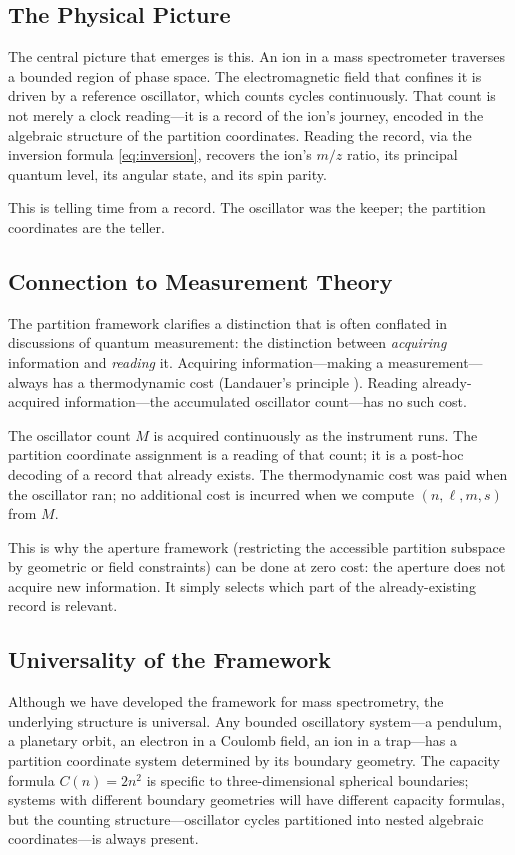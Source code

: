 \documentclass[twocolumn,10pt]{article}
\begin{document}
\subsection{The Physical Picture}

The central picture that emerges is this. An ion in a mass spectrometer traverses a bounded region of phase space. The electromagnetic field that confines it is driven by a reference oscillator, which counts cycles continuously. That count is not merely a clock reading---it is a record of the ion's journey, encoded in the algebraic structure of the partition coordinates. Reading the record, via the inversion formula \eqref{eq:inversion}, recovers the ion's $m/z$ ratio, its principal quantum level, its angular state, and its spin parity.

This is telling time from a record. The oscillator was the keeper; the partition coordinates are the teller.

\subsection{Connection to Measurement Theory}

The partition framework clarifies a distinction that is often conflated in discussions of quantum measurement: the distinction between \emph{acquiring} information and \emph{reading} it. Acquiring information---making a measurement---always has a thermodynamic cost (Landauer's principle \citep{landauer1961}). Reading already-acquired information---the accumulated oscillator count---has no such cost.

The oscillator count $M$ is acquired continuously as the instrument runs. The partition coordinate assignment is a reading of that count; it is a post-hoc decoding of a record that already exists. The thermodynamic cost was paid when the oscillator ran; no additional cost is incurred when we compute $(n, \ell, m, s)$ from $M$.

This is why the aperture framework (restricting the accessible partition subspace by geometric or field constraints) can be done at zero cost: the aperture does not acquire new information. It simply selects which part of the already-existing record is relevant.

\subsection{Universality of the Framework}

Although we have developed the framework for mass spectrometry, the underlying structure is universal. Any bounded oscillatory system---a pendulum, a planetary orbit, an electron in a Coulomb field, an ion in a trap---has a partition coordinate system determined by its boundary geometry. The capacity formula $C(n) = 2n^2$ is specific to three-dimensional spherical boundaries; systems with different boundary geometries will have different capacity formulas, but the counting structure---oscillator cycles partitioned into nested algebraic coordinates---is always present.
\end{document}
